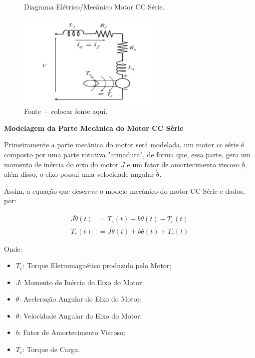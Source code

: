 \begin{figure}[h]
	\centering
	\caption{Diagrama Elétrico/Mecânico Motor CC Série.}
	\includegraphics[width=0.6\textwidth]{Capitulos/4_desenvolvimento/4_figuras/diagrama_motorcc.png}
	\caption*{Fonte $-$ colocar fonte aqui.}
	\label{fig:image_02}
\end{figure}


\noindent \textbf{Modelagem da Parte Mecânica do Motor CC Série}

Primeiramente a parte mecânica do motor será modelada, um motor cc série é composto por uma parte rotativa "armadura", de forma que, essa parte, gera um momento de inércia do eixo do motor $J$ e um fator de amortecimento viscoso $b$, além disso, o eixo possui uma velocidade angular $\dot{\theta}$.

Assim, a equação que descreve o modelo mecânico do motor CC Série e dados, por:

\begin{align}
	J\ddot{\theta}(t) &= T_e(t) - b\dot{\theta}(t) - T_c(t) \label{eq4:eq1} \\
	T_e(t) &= J\ddot{\theta}(t) + b\dot{\theta}(t) + T_c(t) \label{eq4:eq2}
\end{align}


Onde:
\begin{itemize}
	\item $T_e$: Torque Eletromagnético produzido pelo Motor;
	\item $J$: Momento de Inércia do Eixo do Motor;
	\item $\ddot{\theta}$: Aceleração Angular do Eixo do Motor;
	\item $\dot{\theta}$: Velocidade Angular do Eixo do Motor;
	\item $b$: Fator de Amortecimento Viscoso;
	\item $T_c$: Torque de Carga.
\end{itemize}

